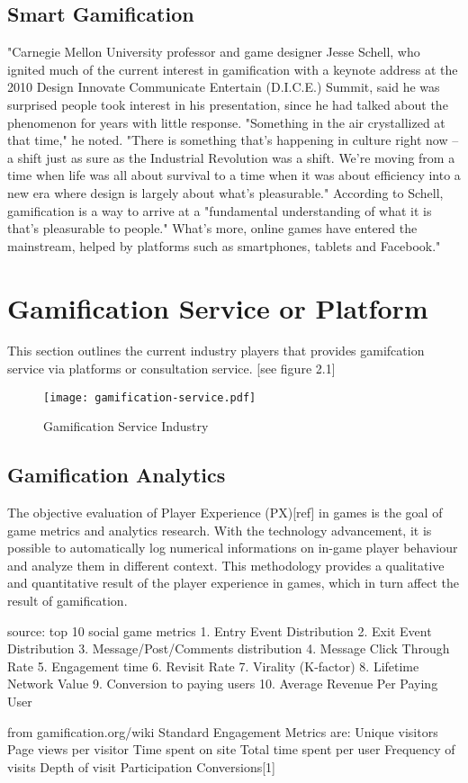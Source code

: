 \subsection{Smart Gamification}
"Carnegie Mellon University professor and game designer Jesse Schell, who ignited much of the current interest in gamification with a keynote address at the 2010 Design Innovate Communicate Entertain (D.I.C.E.) Summit, said he was surprised people took interest in his presentation, since he had talked about the phenomenon for years with little response. "Something in the air crystallized at that time," he noted. "There is something that's happening in culture right now -- a shift just as sure as the Industrial Revolution was a shift. We're moving from a time when life was all about survival to a time when it was about efficiency into a new era where design is largely about what's pleasurable." According to Schell, gamification is a way to arrive at a "fundamental understanding of what it is that's pleasurable to people." What's more, online games have entered the mainstream, helped by platforms such as smartphones, tablets and Facebook."

\section{Gamification Service or Platform}
This section outlines the current industry players that provides gamifcation service via platforms or consultation service. [see figure 2.1]

\begin{figure}[ht]
	\centering
		\texttt{[image: gamification-service.pdf]}
		\caption{Gamification Service Industry}
		\label{fig:gamification-service}
\end{figure}

\subsection{Gamification Analytics}
The objective evaluation of Player Experience (PX)[ref] in games is the goal of game metrics and analytics research. With the technology advancement, it is possible to automatically log numerical informations on in-game player behaviour and analyze them in different context. This methodology provides a qualitative and quantitative result of the player experience in games, which in turn affect the result of gamification.

source: top 10 social game metrics
1. Entry Event Distribution
2. Exit Event Distribution
3. Message/Post/Comments distribution
4. Message Click Through Rate
5. Engagement time
6. Revisit Rate
7. Virality (K-factor)  
8. Lifetime Network Value
9. Conversion to paying users
10. Average Revenue Per Paying User

from gamification.org/wiki Standard Engagement Metrics are:
Unique visitors
Page views per visitor
Time spent on site
Total time spent per user
Frequency of visits
Depth of visit
Participation
Conversions[1]